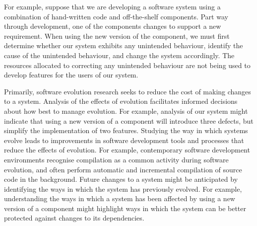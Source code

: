 For example, suppose that we are developing a software system using a combination of hand-written code and off-the-shelf components. Part way through development, one of the components changes to support a new requirement. When using the new version of the component, we must first determine whether our system exhibits any unintended behaviour, identify the cause of the unintended behaviour, and change the system accordingly. The resources allocated to correcting any unintended behaviour are not being used to develop features for the users of our system.

Primarily, software evolution research seeks to reduce the cost of making changes to a system. Analysis of the effects of evolution facilitates informed decisions about how best to manage evolution. For example, analysis of our system might indicate that using a new version of a component will introduce three defects, but simplify the implementation of two features. Studying the way in which systems evolve leads to improvements in software development tools and processes that reduce the effects of evolution. For example, contemporary software development environments recognise compilation as a common activity during software evolution, and often perform automatic and incremental compilation of source code in the background. Future changes to a system might be anticipated by identifying the ways in which the system has previously evolved. For example, understanding the ways in which a system has been affected by using a new version of a component might highlight ways in which the system can be better protected against changes to its dependencies.